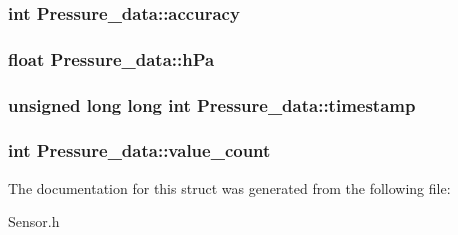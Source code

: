 \subsubsection[{accuracy}]{\setlength{\rightskip}{0pt plus 5cm}int Pressure\-\_\-data\-::accuracy}\label{structPressure__data_ab09a469b916fd17577743502bcc376e4}
\subsubsection[{h\-Pa}]{\setlength{\rightskip}{0pt plus 5cm}float Pressure\-\_\-data\-::h\-Pa}\label{structPressure__data_a3b980871bf6340daf2d52a7e3b489703}
\subsubsection[{timestamp}]{\setlength{\rightskip}{0pt plus 5cm}unsigned long long int Pressure\-\_\-data\-::timestamp}\label{structPressure__data_ad7c0915ab937f53948957ce2f04bf156}
\subsubsection[{value\-\_\-count}]{\setlength{\rightskip}{0pt plus 5cm}int Pressure\-\_\-data\-::value\-\_\-count}\label{structPressure__data_aab72590dac2834f3c8498fe29664fc08}


The documentation for this struct was generated from the following file\-:\begin{DoxyCompactItemize}
\item 
Sensor.\-h\end{DoxyCompactItemize}

